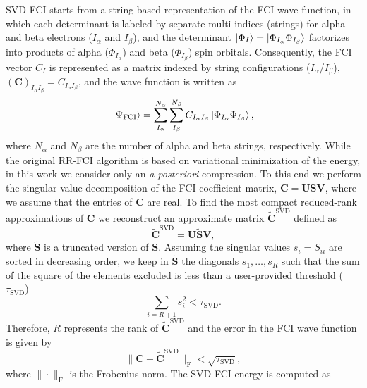 \documentclass[aip,jcp,amsmath,amssymb, reprint]{revtex4-1}
\begin{document}
SVD-FCI starts from a string-based representation of the FCI wave function,\cite{Handy1980MultiRoot}
in which each determinant is labeled by separate multi-indices (strings) for alpha and beta electrons ($I_{\alpha}$ and $I_{\beta}$), and the determinant  $\ket{\Phi_I} = \ket{\Phi_{I_\alpha} \Phi_{I_\beta}}$ factorizes into products of alpha ($\Phi_{I_\alpha}$) and beta ($\Phi_{I_\beta}$) spin orbitals.
Consequently, the FCI vector $C_I$ is represented as a matrix  indexed by string configurations ($I_{\alpha}$/$I_{\beta}$), $(\mathbf{C})_{I_{\alpha}I_{\beta}} = C_{I_{\alpha}I_{\beta}}$, and the wave function is written as 
\begin{equation}
\ket{\Psi_{\text{FCI}}} =\sum_{I_{\alpha}}^{N_{\alpha}} \sum_{I_{\beta}}^{N_{\beta}}  C_{I_{\alpha}I_{\beta}} \ket{\Phi_{I_\alpha} \Phi_{I_\beta}},
\label{eq:fci_mat}
\end{equation}
where $N_\alpha$ and $N_\beta$ are the number of alpha and beta strings, respectively.
While the original RR-FCI algorithm is based on variational minimization of the energy, in this work we consider only an \textit{a posteriori} compression.
To this end we perform the singular value decomposition of the FCI coefficient matrix,  $\mathbf{C} = \mathbf{U} \mathbf{S} \mathbf{V}$, where we assume that the entries of $\mathbf{C}$ are real.
To find the most compact reduced-rank approximations of $\mathbf{C}$ we reconstruct an approximate matrix $\widetilde{\mathbf{C}}^{\text{SVD}}$ defined as
\begin{equation}
\widetilde{\mathbf{C}}^{\text{SVD}} = \mathbf{U} \widetilde{\mathbf{S}} \mathbf{V},
\end{equation}
where $\widetilde{\mathbf{S}}$ is a truncated version of $\mathbf{S}$.
Assuming the singular values $s_i = S_{ii}$ are sorted in decreasing order, we keep in $\widetilde{\mathbf{S}}$ the diagonals $s_1, \ldots, s_R$ such that the sum of the square of the elements excluded is less than a user-provided threshold ($\tau_{\text{SVD}}$)
\begin{equation}
\sum_{i=R + 1} s_{i}^{2} < \tau_{\text{SVD}}.
\end{equation}
Therefore, $R$ represents the rank of $\widetilde{\mathbf{C}}^{\text{SVD}} $ and the error in the FCI wave function is given by
\begin{equation}
\|\mathbf{C} - \widetilde{\mathbf{C}}^{\text{SVD}}\|_\mathrm{F} < \sqrt{\tau_{\text{SVD}}},
\end{equation}
where $\|\cdot\|_\mathrm{F}$ is the Frobenius norm.
The SVD-FCI energy is computed as
\end{document}
